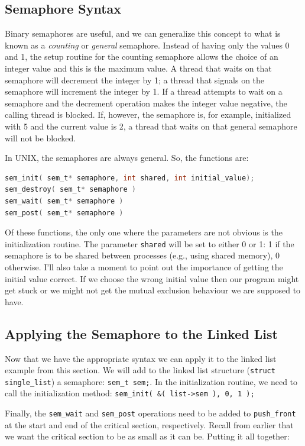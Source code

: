 \subsection*{Semaphore Syntax}

Binary semaphores are useful, and we can generalize this concept to what is known as a \textit{counting} or \textit{general} semaphore. Instead of having only the values 0 and 1, the setup routine for the counting semaphore allows the choice of an integer value and this is the maximum value. A thread that waits on that semaphore will decrement the integer by 1; a thread that signals on the semaphore will increment the integer by 1. If a thread attempts to wait on a semaphore and the decrement operation makes the integer value negative, the calling thread is blocked. If, however, the semaphore is, for example, initialized with 5 and the current value is 2, a thread that waits on that general semaphore will not be blocked.

In UNIX, the semaphores are always general. So, the functions are:

\begin{lstlisting}[language=C]
sem_init( sem_t* semaphore, int shared, int initial_value);
sem_destroy( sem_t* semaphore )
sem_wait( sem_t* semaphore )
sem_post( sem_t* semaphore )
\end{lstlisting}

Of these functions, the only one where the parameters are not obvious is the initialization routine. The parameter \texttt{shared} will be set to either 0 or 1: 1 if the semaphore is to be shared between processes (e.g., using shared memory), 0 otherwise. I'll also take a moment to point out the importance of getting the initial value correct. If we choose the wrong initial value then our program might get stuck or we might not get the mutual exclusion behaviour we are supposed to have.

\subsection*{Applying the Semaphore to the Linked List}

Now that we have the appropriate syntax we can apply it to the linked list example from this section. We will add to the linked list structure (\texttt{struct single\_list}) a semaphore: \texttt{sem\_t sem;}. In the initialization routine, we need to call the initialization method: \texttt{sem\_init( \&( list->sem ), 0, 1 );}

Finally, the \texttt{sem\_wait} and \texttt{sem\_post} operations need to be added to \texttt{push\_front} at the start and end of the critical section, respectively. Recall from earlier that we want the critical section to be as small as it can be. Putting it all together:

